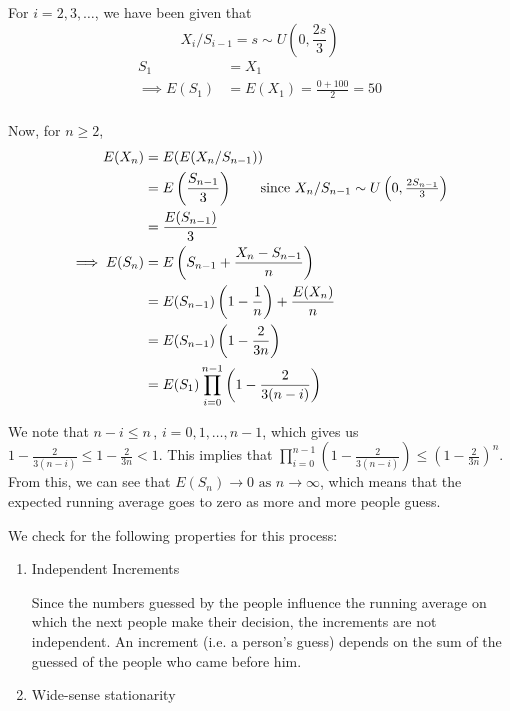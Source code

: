 \documentclass[12pt, oneside]{article}
\begin{document}
\begin{enumerate}
{    For \(i = 2, 3, \ldots\), we have been given that
    \[X_i / S_{i - 1} = s \sim U\left(0, \frac{2s}{3}\right) \]
    \begin{align*}
        S_1 &= X_1 \\
        \implies E(S_1) &= E(X_1) = \frac{0 + 100}{2} = 50 \\
    \end{align*}

    Now, for \(n \geq 2\),
    \begin{align*}
        E(X_n) &= E(E(X_n / S_{n-1})) \\
               &= E\left(\frac{S_{n-1}}{3}\right) \tag*{since \(X_n / S_{n-1} \sim U\left(0, \frac{2S_{n-1}}{3}\right)\)}\\
               &= \frac{E(S_{n-1})}{3} \\
        \implies E(S_n) &= E\left(S_{n-1} + \frac{X_n - S_{n-1}}{n}\right) \\
                        &= E(S_{n-1})\left(1 - \frac{1}{n}\right)+ \frac{E(X_n)}{n} \\
                        &= E(S_{n - 1}) \left(1 - \frac{2}{3n}\right) \\
                        &= E(S_1) \prod_{i = 0}^{n-1}\left(1 - \frac{2}{3(n-i)}\right) \\
    \end{align*}

    We note that \(n - i \leq n \,,\, i = 0, 1, \ldots, n-1\), which gives us 
    \(1 - \frac{2}{3(n-i)} \leq 1 - \frac{2}{3n} < 1\). This implies that 
    \(\prod_{i = 0}^{n-1}\left(1 - \frac{2}{3(n-i)}\right) \leq \left(1 - \frac{2}{3n}\right)^n\).
    From this, we can see that \(E(S_n) \to 0 \text{ as } n \to \infty\), which means that the
    expected running average goes to zero as more and more people guess.

    We check for the following properties for this process:
    \begin{enumerate}
        \item {
            Independent Increments

            Since the numbers guessed by the people influence the running average on which 
            the next people make their decision, the increments are not independent. An
            increment (i.e. a person's guess)  depends on the sum of the guessed of the people
            who came before him.
        }
        \item {
            Wide-sense stationarity

}
\end{enumerate}}
\end{enumerate}
\end{document}
